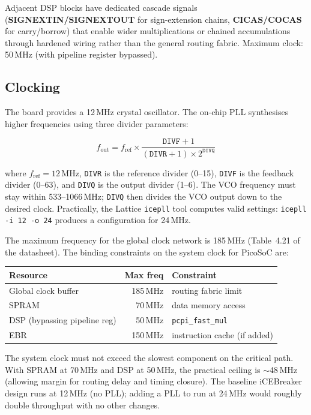 \documentclass[9pt, a4paper]{extarticle}
\begin{document}
Adjacent DSP blocks have dedicated cascade signals (\textbf{SIGNEXTIN/SIGNEXTOUT} for sign-extension chains, \textbf{CICAS/COCAS} for carry/borrow) that enable wider multiplications or chained accumulations through hardened wiring rather than the general routing fabric. Maximum clock: 50\,MHz (with pipeline register bypassed).

\subsection{Clocking}

The board provides a 12\,MHz crystal oscillator. The on-chip PLL synthesises higher frequencies using three divider parameters:

$$
f_{\text{out}} = f_{\text{ref}} \times \frac{\texttt{DIVF} + 1}{(\texttt{DIVR} + 1) \times 2^{\texttt{DIVQ}}}
$$

where $f_{\text{ref}} = 12$\,MHz, \texttt{DIVR} is the reference divider (0--15), \texttt{DIVF} is the feedback divider (0--63), and \texttt{DIVQ} is the output divider (1--6). The VCO frequency must stay within 533--1066\,MHz; \texttt{DIVQ} then divides the VCO output down to the desired clock. Practically, the Lattice \texttt{icepll} tool computes valid settings: \texttt{icepll -i 12 -o 24} produces a configuration for 24\,MHz.

The maximum frequency for the global clock network is 185\,MHz (Table~4.21 of the datasheet). The binding constraints on the system clock for PicoSoC are:

\begin{center}\small
\begin{tabular}{@{}l r l@{}}
    \toprule
    Resource & Max freq & Constraint \\
    \midrule
    Global clock buffer & 185\,MHz & routing fabric limit \\
    SPRAM & 70\,MHz & data memory access \\
    DSP (bypassing pipeline reg) & 50\,MHz & \texttt{pcpi\_fast\_mul} \\
    EBR & 150\,MHz & instruction cache (if added) \\
    \bottomrule
\end{tabular}
\end{center}

The system clock must not exceed the slowest component on the critical path. With SPRAM at 70\,MHz and DSP at 50\,MHz, the practical ceiling is $\sim$48\,MHz (allowing margin for routing delay and timing closure). The baseline iCEBreaker design runs at 12\,MHz (no PLL); adding a PLL to run at 24\,MHz would roughly double throughput with no other changes.
\end{document}
